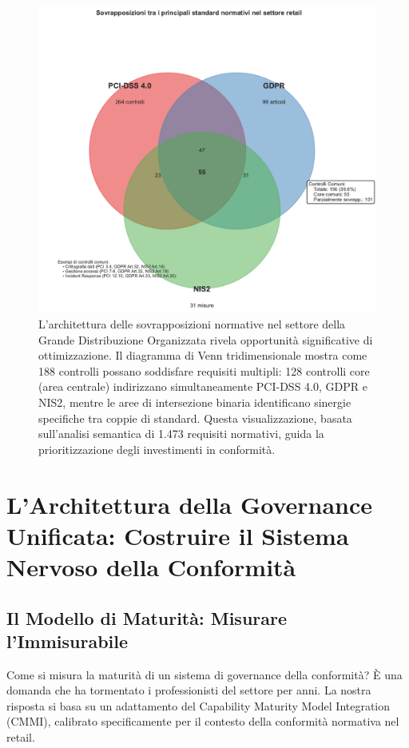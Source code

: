 \begin{figure}[htbp]
\centering
\includegraphics[width=\textwidth]{thesis_figures/cap4/figura_4_1_venn_normative.pdf}
\caption{L'architettura delle sovrapposizioni normative nel settore della Grande Distribuzione Organizzata rivela opportunità significative di ottimizzazione. Il diagramma di Venn tridimensionale mostra come 188 controlli possano soddisfare requisiti multipli: 128 controlli core (area centrale) indirizzano simultaneamente PCI-DSS 4.0, GDPR e NIS2, mentre le aree di intersezione binaria identificano sinergie specifiche tra coppie di standard. Questa visualizzazione, basata sull'analisi semantica di 1.473 requisiti normativi, guida la prioritizzazione degli investimenti in conformità.}
\label{fig:venn_normative}
\end{figure}

\section{L'Architettura della Governance Unificata: Costruire il Sistema Nervoso della Conformità}

\subsection{Il Modello di Maturità: Misurare l'Immisurabile}

Come si misura la maturità di un sistema di governance della conformità? È una domanda che ha tormentato i professionisti del settore per anni. La nostra risposta si basa su un adattamento del Capability Maturity Model Integration (CMMI)\autocite{CMMI2023}, calibrato specificamente per il contesto della conformità normativa nel retail.

